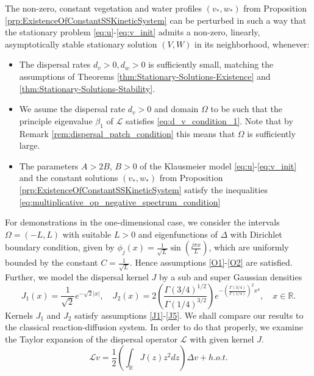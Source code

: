 \documentclass[11pt, a4paper]{article}
\theoremstyle{break}
\theoremstyle{break}
\theoremstyle{break}
\theoremstyle{break}
\theoremstyle{break}
\theoremstyle{break}
\theoremstyle{break}
\theoremstyle{break}
\theoremstyle{break}
\begin{document}
The non-zero, constant vegetation and water profiles $(v_*, w_*)$ from Proposition \ref{prp:ExistenceOfConstantSSKineticSystem} can be perturbed in such a way that the stationary problem \eqref{eq:u}-\eqref{eq:v_init} admits a non-zero, linearly, asymptotically stable stationary solution $(V, W)$ in its neighborhood, whenever: 
\begin{itemize}
    \item[(A1)] The dispersal rates $d_v > 0, d_w > 0$ is sufficiently small, matching the assumptions of Theorems \ref{thm:Stationary-Solutions-Existence} and \ref{thm:Stationary-Solutions-Stability}.
    \item[(A2)] We asume the  dispersal rate $d_v > 0$ and domain $\Omega$ to be such that the  principle eigenvalue $\beta_1$ of $\mathcal{L}$ satisfies \eqref{eq:d_v_condition_1}. Note that by Remark \ref{rem:dispersal_patch_condition} this means that $\Omega$ is sufficiently large.
    \item[(A3)] The parameters $A > 2B$, $B > 0$ of the Klausmeier model \eqref{eq:u}-\eqref{eq:v_init} and the constant solutions $(v_*, w_*)$ from Proposition \ref{prp:ExistenceOfConstantSSKineticSystem} satisfy the inequalities \eqref{eq:multiplicative_op_negative_spectrum_condition}
    
\end{itemize}
For demonstrations in the one-dimensional case, we consider the intervals $\Omega = (-L, L)$ with suitable $L > 0$ and eigenfunctions of $\Delta$ with Dirichlet boundary condition, given by $\phi_j(x) = \frac{1}{\sqrt{L}}\sin(\frac{j\pi x}{L})$, which are uniformly bounded by the constant $C = \frac{1}{\sqrt{L}}$. Hence assumptions \ref{O1}-\ref{O2} are satisfied. Further, we model the dispersal kernel $J$ by a sub and super Gaussian densities 
\begin{equation}
    \label{eq:1dGaussian_PDF}
    J_1(x) = \frac{1}{\sqrt{2}} e^{-\sqrt{2}|x|}, \quad
    J_2(x) = 2 \left(\frac{\Gamma(3/4)^{1/2}}{\Gamma(1/4)^{3/2}}\right) e^{- \left( \frac{\Gamma(3/4)}{\Gamma(1/4)}\right)^2 x^4}, \quad x \in \mathbb{R}.
\end{equation}
Kernels $J_1$ and $J_2$ satisfy assumptions \ref{J1}-\ref{J5}. We shall compare our results to the classical reaction-diffusion system. In order to do that properly, we examine the Taylor expansion of the dispersal operator $\mathcal{L}$ with given kernel $J$.
\begin{equation}
    \label{eq:dispersal_op_taylor_expansion}
    \mathcal{L} v = \frac{1}{2}\left(\int_{\mathbb{R}} J(z)z^2dz\right) \Delta v + h.o.t.
\end{equation}
\end{document}
